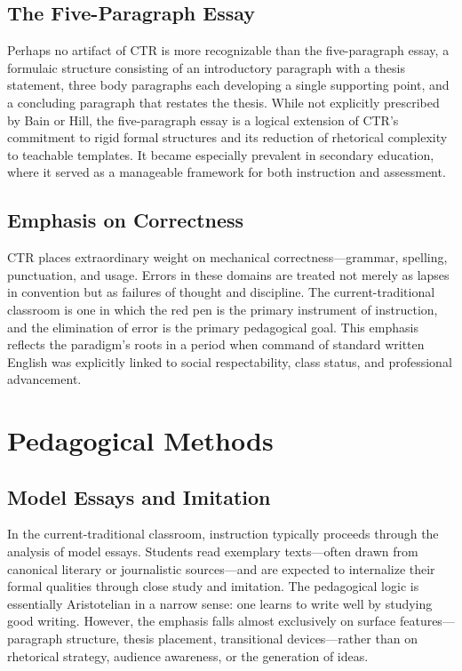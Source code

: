 \documentclass[12pt]{article}
\begin{document}
\subsection{The Five-Paragraph Essay}

Perhaps no artifact of CTR is more recognizable than the five-paragraph essay, a formulaic structure consisting of an introductory paragraph with a thesis statement, three body paragraphs each developing a single supporting point, and a concluding paragraph that restates the thesis. While not explicitly prescribed by Bain or Hill, the five-paragraph essay is a logical extension of CTR's commitment to rigid formal structures and its reduction of rhetorical complexity to teachable templates. It became especially prevalent in secondary education, where it served as a manageable framework for both instruction and assessment.

\subsection{Emphasis on Correctness}

CTR places extraordinary weight on mechanical correctness---grammar, spelling, punctuation, and usage. Errors in these domains are treated not merely as lapses in convention but as failures of thought and discipline. The current-traditional classroom is one in which the red pen is the primary instrument of instruction, and the elimination of error is the primary pedagogical goal. This emphasis reflects the paradigm's roots in a period when command of standard written English was explicitly linked to social respectability, class status, and professional advancement.

\section{Pedagogical Methods}

\subsection{Model Essays and Imitation}

In the current-traditional classroom, instruction typically proceeds through the analysis of model essays. Students read exemplary texts---often drawn from canonical literary or journalistic sources---and are expected to internalize their formal qualities through close study and imitation. The pedagogical logic is essentially Aristotelian in a narrow sense: one learns to write well by studying good writing. However, the emphasis falls almost exclusively on surface features---paragraph structure, thesis placement, transitional devices---rather than on rhetorical strategy, audience awareness, or the generation of ideas.
\end{document}
